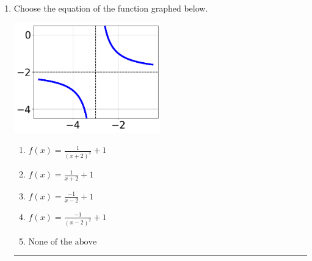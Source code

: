 \documentclass[14pt]{extbook}
\newcommand{\litem}[1]{\item#1\hspace*{-1cm}\rule{\textwidth}{0.4pt}}
\begin{document}
\begin{enumerate}
{\begin{enumerate}[label=\Alph*.]
\end{enumerate} }
\litem{
Choose the equation of the function graphed below.
\begin{center}
    \includegraphics[width=0.5\textwidth]{../Figures/rationalGraphToEquationB.png}
\end{center}
\begin{enumerate}[label=\Alph*.]
\item \( f(x) = \frac{1}{(x + 2)^2} + 1 \)
\item \( f(x) = \frac{1}{x + 2} + 1 \)
\item \( f(x) = \frac{-1}{x - 2} + 1 \)
\item \( f(x) = \frac{-1}{(x - 2)^2} + 1 \)
\item \( \text{None of the above} \)


\end{enumerate}}
\end{enumerate}
\end{document}
